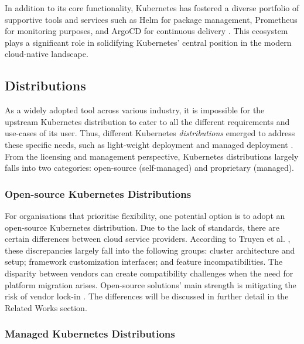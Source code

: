 In addition to its core functionality, Kubernetes has fostered a diverse portfolio of supportive tools and services such as Helm for package management, Prometheus for monitoring purposes, and ArgoCD for continuous delivery \cite{Helm, prometheusOverviewPrometheus, ArgoCDDeclarative}. This ecosystem plays a significant role in solidifying Kubernetes' central position in the modern cloud-native landscape.

\subsection{Distributions}
As a widely adopted tool across various industry, it is impossible for the upstream Kubernetes distribution to cater to all the different requirements and use-cases of its user. Thus, different Kubernetes \textit{distributions} emerged to address these specific needs, such as light-weight deployment and managed deployment \cite{bohmProfilingLightweightContainer2021, pereiraferreiraPerformanceEvaluationContainers2019}. From the licensing and management perspective, Kubernetes distributions largely falls into two categories: open-source (self-managed) and proprietary (managed).

\subsubsection{Open-source Kubernetes Distributions}

For organisations that prioritise flexibility, one potential option is to adopt an open-source Kubernetes distribution. Due to the lack of standards, there are certain differences between cloud service providers. According to Truyen et al. \cite{truyenManagingFeatureCompatibility2020}, these discrepancies largely fall into the following groups: cluster architecture and setup; framework customization interfaces; and feature incompatibilities. The disparity between vendors can create compatibility challenges when the need for platform migration arises. Open-source solutions' main strength is mitigating the risk of vendor lock-in \cite{shaikh2011total}. The differences will be discussed in further detail in the Related Works section.

\subsubsection{Managed Kubernetes Distributions}


